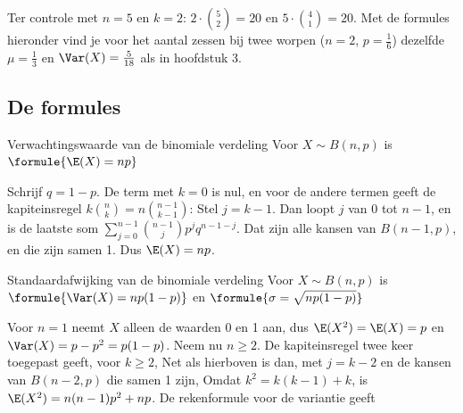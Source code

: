Ter controle met $n = 5$ en $k = 2$: $2 \cdot \binom52 = 20$ en $5 \cdot \binom41 = 20$. Met de formules hieronder vind je voor het aantal zessen bij twee worpen ($n = 2$, $p = \frac16$) dezelfde $\mu = \frac13$ en $\Var(X) = \frac{5}{18}$ als in hoofdstuk 3.

\subsection{De formules}

\begin{theorie}
\begin{stelling}{Verwachtingswaarde van de binomiale verdeling}
Voor $X \sim B(n, p)$ is \quad $\formule{\E(X) = np}$
\end{stelling}

\begin{bewijs}
Schrijf $q = 1 - p$. De term met $k = 0$ is nul, en voor de andere termen geeft de kapiteinsregel $k\binom{n}{k} = n\binom{n-1}{k-1}$:
Stel $j = k - 1$. Dan loopt $j$ van 0 tot $n - 1$, en is de laatste som $\sum_{j=0}^{n-1} \binom{n-1}{j} p^j q^{n-1-j}$. Dat zijn alle kansen van $B(n - 1, p)$, en die zijn samen 1. Dus $\E(X) = np$.
\end{bewijs}

\begin{stelling}{Standaardafwijking van de binomiale verdeling}
Voor $X \sim B(n, p)$ is \quad $\formule{\Var(X) = np(1 - p)}$ \quad en \quad $\formule{\sigma = \sqrt{np(1 - p)}}$
\end{stelling}

\begin{bewijs}
Voor $n = 1$ neemt $X$ alleen de waarden 0 en 1 aan, dus $\E(X^2) = \E(X) = p$ en $\Var(X) = p - p^2 = p(1 - p)$. Neem nu $n \geqslant 2$. De kapiteinsregel twee keer toegepast geeft, voor $k \geqslant 2$,
Net als hierboven is dan, met $j = k - 2$ en de kansen van $B(n - 2, p)$ die samen 1 zijn,
Omdat $k^2 = k(k - 1) + k$, is $\E(X^2) = n(n - 1)p^2 + np$. De rekenformule voor de variantie geeft
\end{bewijs}
\end{theorie}

